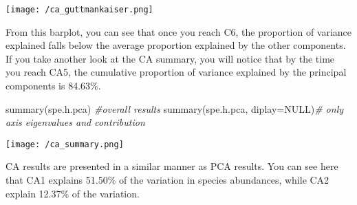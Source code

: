 \documentclass[
]{book}
\newenvironment{Shaded}{\begin{snugshade}}{\end{snugshade}}
\newcommand{\AttributeTok}[1]{\textcolor[rgb]{0.77,0.63,0.00}{#1}}
\newcommand{\CommentTok}[1]{\textcolor[rgb]{0.56,0.35,0.01}{\textit{#1}}}
\newcommand{\ConstantTok}[1]{\textcolor[rgb]{0.00,0.00,0.00}{#1}}
\newcommand{\DecValTok}[1]{\textcolor[rgb]{0.00,0.00,0.81}{#1}}
\newcommand{\FunctionTok}[1]{\textcolor[rgb]{0.00,0.00,0.00}{#1}}
\newcommand{\NormalTok}[1]{#1}
\newcommand{\OtherTok}[1]{\textcolor[rgb]{0.56,0.35,0.01}{#1}}
\newcommand{\SpecialCharTok}[1]{\textcolor[rgb]{0.00,0.00,0.00}{#1}}
\newcommand{\StringTok}[1]{\textcolor[rgb]{0.31,0.60,0.02}{#1}}
\begin{document}
\begin{Shaded}
\end{Shaded}

\texttt{[image: /ca\_guttmankaiser.png]}

From this barplot, you can see that once you reach C6, the proportion of
variance explained falls below the average proportion explained by the
other components. If you take another look at the CA summary, you will
notice that by the time you reach CA5, the cumulative proportion of
variance explained by the principal components is 84.63\%.

\begin{Shaded}
\begin{Highlighting}[]
\FunctionTok{summary}\NormalTok{(spe.h.pca) }\CommentTok{\#overall results}
\FunctionTok{summary}\NormalTok{(spe.h.pca, }\AttributeTok{diplay=}\ConstantTok{NULL}\NormalTok{)}\CommentTok{\# only axis eigenvalues and contribution}
\end{Highlighting}
\end{Shaded}

\texttt{[image: /ca\_summary.png]}

CA results are presented in a similar manner as PCA results. You can see
here that CA1 explains 51.50\% of the variation in species abundances,
while CA2 explain 12.37\% of the variation.
\end{document}
